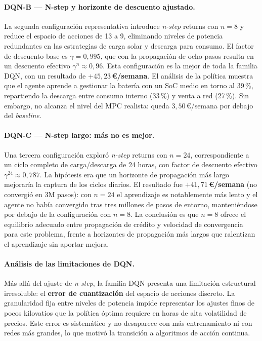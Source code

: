 \documentclass[12pt, a4paper, twoside]{report}
\begin{document}
\paragraph{DQN-B — N-step y horizonte de descuento ajustado.}
La segunda configuración representativa introduce \textit{n-step} returns con
$n=8$ y reduce el espacio de acciones de 13 a 9, eliminando niveles de potencia
redundantes en las estrategias de carga solar y descarga para consumo. El factor
de descuento base es $\gamma = 0{,}995$, que con la propagación de ocho pasos
resulta en un descuento efectivo $\gamma^n \approx 0{,}96$. Esta configuración es
la mejor de toda la familia DQN, con un resultado de
\textbf{$+45{,}23$\,€/semana}. El análisis de la política muestra que el agente
aprende a gestionar la batería con un SoC medio en torno al 39\,\%, repartiendo
la descarga entre consumo interno (33\,\%) y venta a red (27\,\%). Sin embargo,
no alcanza el nivel del MPC realista: queda $3{,}50$\,€/semana por debajo del
\textit{baseline}.

\paragraph{DQN-C — N-step largo: más no es mejor.}
Una tercera configuración exploró \textit{n-step} returns con $n=24$,
correspondiente a un ciclo completo de carga/descarga de 24 horas, con factor
de descuento efectivo $\gamma^{24} \approx 0{,}787$. La hipótesis era que un
horizonte de propagación más largo mejoraría la captura de los ciclos diarios.
El resultado fue \textbf{$+41{,}71$\,€/semana} (no convergió en 3M pasos): con
$n=24$ el aprendizaje es notablemente más lento y el agente no había convergido
tras tres millones de pasos de entorno, manteniéndose por debajo de la
configuración con $n=8$. La conclusión es que $n=8$ ofrece el equilibrio
adecuado entre propagación de crédito y velocidad de convergencia para este
problema, frente a horizontes de propagación más largos que ralentizan el
aprendizaje sin aportar mejora.

\paragraph{Análisis de las limitaciones de DQN.}
Más allá del ajuste de \textit{n-step}, la familia DQN presenta una limitación
estructural irresoluble: el \textbf{error de cuantización} del espacio de
acciones discreto. La granularidad fija entre niveles de potencia impide
representar los ajustes finos de pocos kilovatios que la política óptima
requiere en horas de alta volatilidad de precios. Este error es sistemático
y no desaparece con más entrenamiento ni con redes más grandes, lo que motivó
la transición a algoritmos de acción continua.
\end{document}
